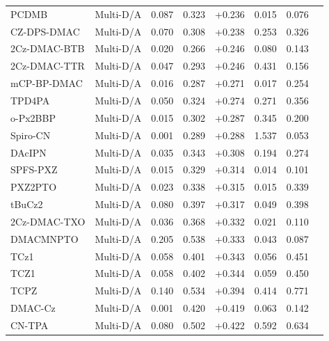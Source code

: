 \begin{longtable}{llcccccc}
PCDMB & Multi-D/A & 0.087 & 0.323 & +0.236 & 0.015 & 0.076 & \cite{doi101016jorgel2021106187} \\
CZ-DPS-DMAC & Multi-D/A & 0.070 & 0.308 & +0.238 & 0.253 & 0.326 & \cite{doi101016jorgel2021106411} \\
2Cz-DMAC-BTB & Multi-D/A & 0.020 & 0.266 & +0.246 & 0.080 & 0.143 & \cite{doi101016jcclet202108064} \\
2Cz-DMAC-TTR & Multi-D/A & 0.047 & 0.293 & +0.246 & 0.431 & 0.156 & \cite{doi101016jcclet202108064} \\
mCP-BP-DMAC & Multi-D/A & 0.016 & 0.287 & +0.271 & 0.017 & 0.254 & \cite{doi101016jcej2022138919} \\
TPD4PA & Multi-D/A & 0.050 & 0.324 & +0.274 & 0.271 & 0.356 & \cite{doi101016jcej2022138498} \\
o-Px2BBP & Multi-D/A & 0.015 & 0.302 & +0.287 & 0.345 & 0.200 & \cite{doi101016jdyepig2023111104} \\
Spiro-CN & Multi-D/A & 0.001 & 0.289 & +0.288 & 1.537 & 0.053 & \cite{doi101039C2CC31468A} \\
DAcIPN & Multi-D/A & 0.035 & 0.343 & +0.308 & 0.194 & 0.274 & \cite{doi101016jorgel201809002} \\
SPFS-PXZ & Multi-D/A & 0.015 & 0.329 & +0.314 & 0.014 & 0.101 & \cite{doi101039C9TC02032B} \\
PXZ2PTO & Multi-D/A & 0.023 & 0.338 & +0.315 & 0.015 & 0.339 & \cite{doi101039C8TC03648A} \\
tBuCz2 & Multi-D/A & 0.080 & 0.397 & +0.317 & 0.049 & 0.398 & \cite{doi101039D1SC07180G} \\
2Cz-DMAC-TXO & Multi-D/A & 0.036 & 0.368 & +0.332 & 0.021 & 0.110 & \cite{doi101016jcclet202108064} \\
DMACMNPTO & Multi-D/A & 0.205 & 0.538 & +0.333 & 0.043 & 0.087 & \cite{doi101039C9TC05917B} \\
TCz1 & Multi-D/A & 0.058 & 0.401 & +0.343 & 0.056 & 0.451 & \cite{doi101016jorgel201809002} \\
TCZ1 & Multi-D/A & 0.058 & 0.402 & +0.344 & 0.059 & 0.450 & \cite{doi101016jorgel201809002} \\
TCPZ & Multi-D/A & 0.140 & 0.534 & +0.394 & 0.414 & 0.771 & \cite{doi101016jorgel201211003} \\
DMAC-Cz & Multi-D/A & 0.001 & 0.420 & +0.419 & 0.063 & 0.142 & \cite{doi101016jorgel2021106312} \\
CN-TPA & Multi-D/A & 0.080 & 0.502 & +0.422 & 0.592 & 0.634 & \cite{doi101016jcej2021130470} \\

\end{longtable}
